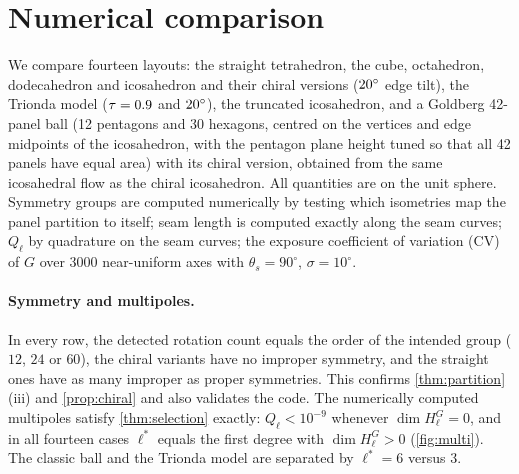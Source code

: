 \documentclass[11pt]{article}
\theoremstyle{definition}
\theoremstyle{remark}
\begin{document}
\section{Numerical comparison}\label{sec:numerics}
We compare fourteen layouts: the straight tetrahedron, the cube, octahedron, dodecahedron and icosahedron and their chiral versions ($20^\circ$ edge tilt), the
Trionda model ($\tau=0.9$ and $20^\circ$), the truncated icosahedron, and a Goldberg 42-panel ball (12 pentagons and 30 hexagons, centred on the vertices and edge midpoints of the icosahedron, with the pentagon plane height tuned so that all 42 panels have equal area) with its chiral version, obtained from the same icosahedral flow as the chiral icosahedron. All quantities are on the unit sphere. Symmetry groups are computed
numerically by testing which isometries map the panel partition to itself; seam length is computed exactly along the seam curves; $Q_\ell$ by quadrature on the seam curves; the exposure
coefficient of variation (CV) of $G$ over $3000$ near-uniform axes with $\theta_s=90^\circ$, $\sigma=10^\circ$.

\begin{table}[tbp]\centering\footnotesize

\caption{Fourteen layouts. ``Symmetry'' lists the group and the number of rotations (plus improper isometries if achiral). $\ell^*$: lowest $\ell\ge1$ with $Q_\ell>10^{-9}$.
Length/area is seam length divided by $4\pi$. Mean $|\kappa_g|$ is the arclength-weighted mean geodesic curvature of the seams.}\label{tab:family}
\end{table}

\paragraph{Symmetry and multipoles.}
In every row, the detected rotation count equals the order of the intended group ($12$, $24$ or $60$), the chiral variants have no improper symmetry, and the straight ones have as many
improper as proper symmetries. This confirms \cref{thm:partition}(iii) and \cref{prop:chiral} and also validates the code. The numerically computed multipoles satisfy
\cref{thm:selection} exactly: $Q_\ell<10^{-9}$ whenever $\dim H_\ell^G=0$, and in all fourteen cases $\ell^*$ equals the first degree with $\dim H^G_\ell>0$ (\cref{fig:multi}). The classic ball and the Trionda model are separated by $\ell^*=6$ versus $3$.
\end{document}
